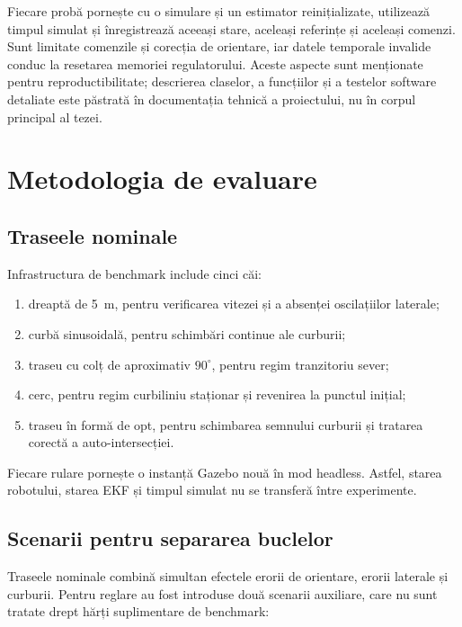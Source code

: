 \documentclass[12pt,a4paper,oneside]{report}
\begin{document}
Fiecare probă pornește cu o simulare și un estimator reinițializate, utilizează
timpul simulat și înregistrează aceeași stare, aceleași referințe și aceleași
comenzi. Sunt limitate comenzile și corecția de orientare, iar datele temporale
invalide conduc la resetarea memoriei regulatorului. Aceste aspecte sunt
menționate pentru reproductibilitate; descrierea claselor, a funcțiilor și a
testelor software detaliate este păstrată în documentația tehnică a proiectului,
nu în corpul principal al tezei.

\chapter{Metodologia de evaluare}

\section{Traseele nominale}

Infrastructura de benchmark include cinci căi:

\begin{enumerate}
  \item dreaptă de \SI{5}{m}, pentru verificarea vitezei și a absenței
        oscilațiilor laterale;
  \item curbă sinusoidală, pentru schimbări continue ale curburii;
  \item traseu cu colț de aproximativ $90^\circ$, pentru regim tranzitoriu sever;
  \item cerc, pentru regim curbiliniu staționar și revenirea la punctul inițial;
  \item traseu în formă de opt, pentru schimbarea semnului curburii și tratarea
        corectă a auto-intersecției.
\end{enumerate}

Fiecare rulare pornește o instanță Gazebo nouă în mod headless. Astfel, starea
robotului, starea EKF și timpul simulat nu se transferă între experimente.

\section{Scenarii pentru separarea buclelor}

Traseele nominale combină simultan efectele erorii de orientare, erorii
laterale și curburii. Pentru reglare au fost introduse două scenarii auxiliare,
care nu sunt tratate drept hărți suplimentare de benchmark:
\end{document}

